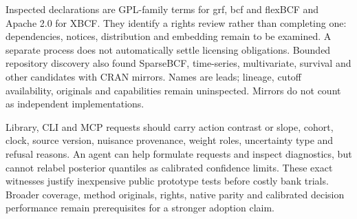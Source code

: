 Inspected declarations are GPL-family terms for grf, bcf and flexBCF and Apache 2.0 for XBCF. They identify a rights review rather than completing one: dependencies, notices, distribution and embedding remain to be examined. A separate process does not automatically settle licensing obligations. Bounded repository discovery also found SparseBCF, time-series, multivariate, survival and other candidates with CRAN mirrors. Names are leads; lineage, cutoff availability, originals and capabilities remain uninspected. Mirrors do not count as independent implementations.~\citep{exec21_cxx_grf,exec21_cxx_bcf,exec21_cxx_xbcf,exec21_cxx_flexbcf}

Library, CLI and MCP requests should carry action contrast or slope, cohort, clock, source version, nuisance provenance, weight roles, uncertainty type and refusal reasons. An agent can help formulate requests and inspect diagnostics, but cannot relabel posterior quantiles as calibrated confidence limits. These exact witnesses justify inexpensive public prototype tests before costly bank trials. Broader coverage, method originals, rights, native parity and calibrated decision performance remain prerequisites for a stronger adoption claim.
